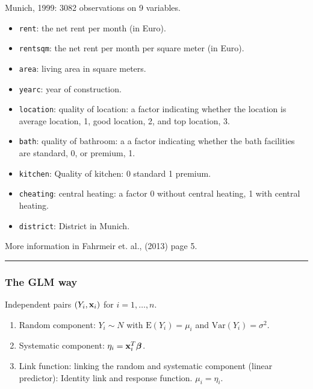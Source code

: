 \documentclass[
]{article}
\providecommand{\tightlist}{%
  \setlength{\itemsep}{0pt}\setlength{\parskip}{0pt}}
\begin{document}
Munich, 1999: 3082 observations on 9 variables.

\begin{itemize}
\tightlist
\item
  \texttt{rent}: the net rent per month (in Euro).
\item
  \texttt{rentsqm}: the net rent per month per square meter (in Euro).
\item
  \texttt{area}: living area in square meters.
\item
  \texttt{yearc}: year of construction.
\item
  \texttt{location}: quality of location: a factor indicating whether
  the location is average location, 1, good location, 2, and top
  location, 3.
\item
  \texttt{bath}: quality of bathroom: a a factor indicating whether the
  bath facilities are standard, 0, or premium, 1.
\item
  \texttt{kitchen}: Quality of kitchen: 0 standard 1 premium.
\item
  \texttt{cheating}: central heating: a factor 0 without central
  heating, 1 with central heating.
\item
  \texttt{district}: District in Munich.
\end{itemize}

More information in Fahrmeir et. al., (2013) page 5.

\begin{center}\rule{0.5\linewidth}{0.5pt}\end{center}

\hypertarget{the-glm-way-1}{%
\subsubsection{The GLM way}\label{the-glm-way-1}}

Independent pairs \((Y_i, {\bf x}_i)\) for \(i=1,\ldots,n\).

\begin{enumerate}
\def\labelenumi{\arabic{enumi}.}
\tightlist
\item
  Random component: \(Y_i \sim N\) with \(\text{E}(Y_i)=\mu_i\) and
  \(\text{Var}(Y_i)=\sigma^2\).
\item
  Systematic component: \(\eta_i={\bf x}_i^T \boldsymbol{\beta}\).
\item
  Link function: linking the random and systematic component (linear
  predictor): Identity link and response function. \(\mu_i=\eta_i\).
\end{enumerate}
\end{document}
